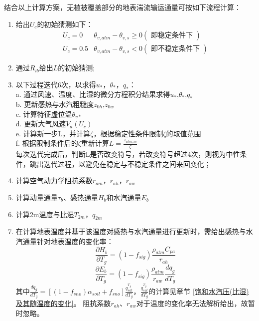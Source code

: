 结合以上计算方案，无植被覆盖部分的地表湍流输运通量可按如下流程计算：
\begin{enumerate}
     \item 给出$U_c$的初始猜测如下：
     \begin{equation}
          \begin{array}{cc}U_{c}=0 & \theta_{v, atm}-\theta_{v, s} \geq 0(\text { 即稳定条件下 }) \\ U_{c}=0.5 & \theta_{v, atm}-\theta_{v, s}<0(\text { 即不稳定条件下 })\end{array}
          \end{equation}
     \item 通过$R_{ib}$给出$L$的初始猜测;
     \item 以下过程迭代6次，以求得$u_\ast$，$\theta_\ast$，$q_\ast$：\\
     a. 通过风速、温度、比湿的微分方程积分结果求得$u_\ast$,$\theta_\ast$,$q_\ast$ \\
     b. 更新感热与水汽粗糙度$z_{0h}$,$z_{0w}$ \\
     c. 计算特征虚位温$\theta_{v\ast}$ \\
     d. 更新大气风速$V_a\left(U_c\right)$ \\
     e. 计算新一步L，并计算$\zeta$，根据稳定性条件限制$\zeta$的取值范围 \\
     f. 根据限制条件后的$\zeta$重新计算$L=\frac{z_{atm,m}}{\zeta}$ \\
     每次迭代完成后，判断L是否改变符号，若改变符号超过4次，则视为中性条件，跳出迭代过程，以避免在稳定与不稳定条件之间来回变化；
     \item 计算空气动力学阻抗系数$r_{am}$，$r_{ah}$，$r_{aw}$
     \item 计算动量通量$\tau_b$、感热通量$H_b$和水汽通量$E_b$
     \item 计算2m温度与比湿$T_{2m}$，$q_{2m}$
     \item 在计算地表温度并基于该温度对感热与水汽通量进行更新时，需给出感热与水汽通量针对地表温度的变化率：
     \begin{equation}
          \frac{\partial H_{b}}{\partial T_{g}}=\left(1-f_{sig}\right) \frac{\rho_{atm} C_{p a}}{r_{a h}}
          \end{equation}
          \begin{equation}
          \frac{\partial E_{b}}{\partial T_{g}}=\left(1-f_{sig}\right) \frac{\rho_{atm}}{r_{a w}} \frac{d q_{g}}{d T_{g}}
     \end{equation}
     其中$\frac{dq_g}{dT_g}=\left[\left(1-f_{sno}\right)\alpha_{soil}+f_{sno}\right]\frac{q_{sat}^{T_g}}{dT_g}$，$\frac{q_{sat}^{T_g}}{dT_g}$的计算见章节 \ref{饱和水汽压(比湿)及其随温度的变化}。
     阻抗系数$r_{ah}$、$r_{aw}$对于温度的变化率无法解析给出，故暂时忽略。

 \end{enumerate}


